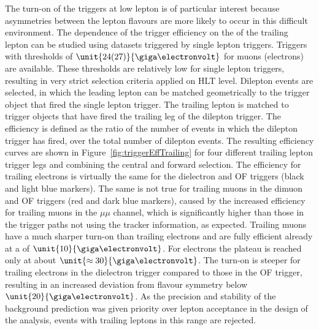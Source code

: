 The turn-on of the triggers at low lepton \pt is of particular interest because asymmetries between the lepton flavours are more likely to occur in this difficult environment. The dependence of the trigger efficiency on the \pt of the trailing lepton can be studied using datasets triggered by single lepton triggers. Triggers with \pt thresholds of $\unit{24 (27)}{\giga\electronvolt}$ for muons (electrons) are available. These thresholds are relatively low for single lepton triggers, resulting in very strict selection criteria applied on HLT level. Dilepton events are selected, in which the leading lepton can be matched  geometrically to the trigger object that fired the single lepton trigger. The trailing lepton is matched to trigger objects that have fired the trailing leg of the dilepton trigger. The efficiency is defined as the ratio of the number of events in which the dilepton trigger has fired, over the total number of dilepton events. The resulting efficiency curves are shown in Figure~\ref{fig:triggerEffTrailing} for four different trailing lepton trigger legs and combining the central and forward selection. The efficiency for trailing electrons is virtually the same for the dielectron and OF triggers (black and light blue markers). The same is not true for trailing muons in the dimuon and OF triggers (red and dark blue markers), caused by the increased efficiency for trailing muons in the $\mu\mu$ channel, which is significantly higher than those in the trigger paths not using the tracker information, as expected. Trailing muons have a much sharper turn-on than trailing electrons and are fully efficient already at a \pt of $\unit{10}{\giga\electronvolt}$. For electrons the plateau is reached only at about $\unit{\approx 30}{\giga\electronvolt}$. The turn-on is steeper for trailing electrons in the dielectron trigger compared to those in the OF trigger, resulting in an increased deviation from flavour symmetry below $\unit{20}{\giga\electronvolt}$. As the precision and stability of the background prediction was given priority over lepton acceptance in the design of the analysis, events with trailing leptons in this \pt range are rejected.  
